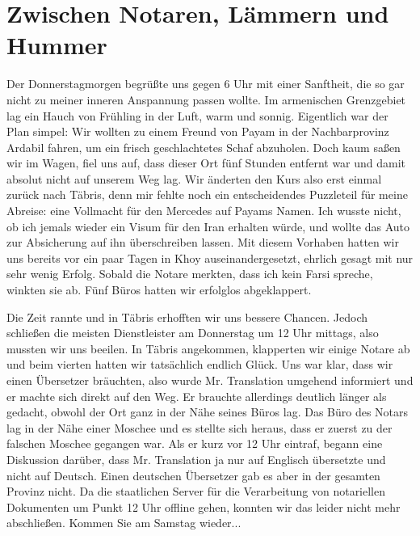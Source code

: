 \chapter*{Zwischen Notaren, Lämmern und Hummer}

Der Donnerstagmorgen begrüßte uns gegen 6 Uhr mit einer Sanftheit, die so gar nicht zu meiner inneren Anspannung passen wollte. Im armenischen Grenzgebiet lag ein Hauch von Frühling in der Luft, warm und sonnig. Eigentlich war der Plan simpel: Wir wollten zu einem Freund von Payam in der Nachbarprovinz Ardabil fahren, um ein frisch geschlachtetes Schaf abzuholen. Doch kaum saßen wir im Wagen, fiel uns auf, dass dieser Ort fünf Stunden entfernt war und damit absolut nicht auf unserem Weg lag. Wir änderten den Kurs also erst einmal zurück nach Täbris, denn mir fehlte noch ein entscheidendes Puzzleteil für meine Abreise: eine Vollmacht für den Mercedes auf Payams Namen. Ich wusste nicht, ob ich jemals wieder ein Visum für den Iran erhalten würde, und wollte das Auto zur Absicherung auf ihn überschreiben lassen. Mit diesem Vorhaben hatten wir uns bereits vor ein paar Tagen in Khoy auseinandergesetzt, ehrlich gesagt mit nur sehr wenig Erfolg. Sobald die Notare merkten, dass ich kein Farsi spreche, winkten sie ab. Fünf Büros hatten wir erfolglos abgeklappert.

Die Zeit rannte und in Täbris erhofften wir uns bessere Chancen. Jedoch schließen die meisten Dienstleister am Donnerstag um 12 Uhr mittags, also mussten wir uns beeilen. In Täbris angekommen, klapperten wir einige Notare ab und beim vierten hatten wir tatsächlich endlich Glück. Uns war klar, dass wir einen Übersetzer bräuchten, also wurde Mr. Translation umgehend informiert und er machte sich direkt auf den Weg. Er brauchte allerdings deutlich länger als gedacht, obwohl der Ort ganz in der Nähe seines Büros lag. Das Büro des Notars lag in der Nähe einer Moschee und es stellte sich heraus, dass er zuerst zu der falschen Moschee gegangen war. Als er kurz vor 12 Uhr eintraf, begann eine Diskussion darüber, dass Mr. Translation ja nur auf Englisch übersetzte und nicht auf Deutsch. Einen deutschen Übersetzer gab es aber in der gesamten Provinz nicht. Da die staatlichen Server für die Verarbeitung von notariellen Dokumenten um Punkt 12 Uhr offline gehen, konnten wir das leider nicht mehr abschließen. Kommen Sie am Samstag wieder...

